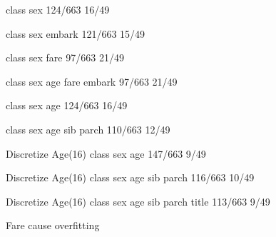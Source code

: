 class sex
124/663
16/49

class sex embark
121/663
15/49

class sex fare
97/663
21/49

class sex age fare embark
97/663
21/49

class sex age
124/663
16/49

class sex age sib parch
110/663
12/49


Discretize Age(16)
class sex age
147/663
9/49

Discretize Age(16)
class sex age sib parch
116/663
10/49

Discretize Age(16)
class sex age sib parch title
113/663
9/49

Fare cause overfitting
